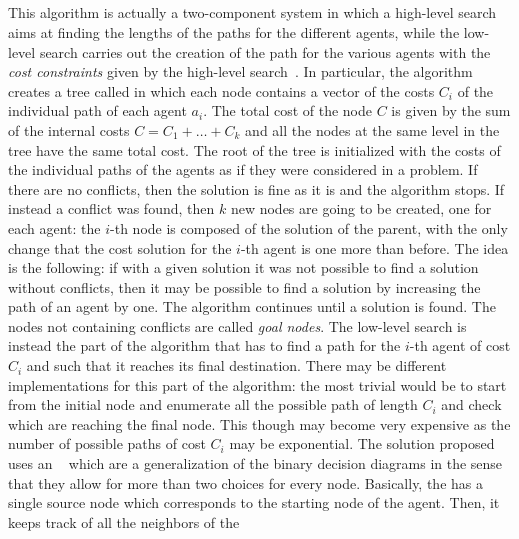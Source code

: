 \subsection{}
This algorithm is actually a two-component system in which a high-level search
aims at finding the lengths of the paths for the different agents, while the 
low-level search carries out the creation of the path for the various
agents with the \textit{cost constraints} given by the high-level 
search~\cite{MAPF_overview,ICTS}. \newline
In particular, the algorithm creates a tree called  in which each 
node contains a vector of the costs $C_i$ of the individual path of each agent
$a_i$. The total cost of the node $C$ is given by the sum of the internal costs
$C=C_1+\hdots+C_k$ and all the nodes at the same level in the tree have the
same total cost. \newline
The root of the tree is initialized with the costs of the individual paths of
the agents as if they were considered in a  problem. If there are no
conflicts, then the solution is fine as it is and the algorithm stops. If 
instead a conflict was found, then $k$ new nodes are going to be created, one 
for each agent: the $i$-th node is composed of the solution of the parent, with
the only change that the cost solution for the $i$-th agent is one more than
before. The idea is the following: if with a given solution it was not possible
to find a solution without conflicts, then it may be possible to find a
solution by increasing the path of an agent by one. The algorithm continues 
until a solution is found. The  nodes not containing conflicts are 
called \textit{goal nodes}. \newline
The low-level search is instead the part of the algorithm that has to find a
path for the $i$-th agent of cost $C_i$ and such that it reaches its final
destination. There may be different implementations for this part of the
algorithm: the most trivial would be to start from the initial node and
enumerate all the possible path of length $C_i$ and check which are reaching
the final node. This though may become very expensive as the number of possible
paths of cost $C_i$ may be exponential. The solution proposed~\cite{ICTS} uses
an ~\cite{MDD} which are a generalization of the binary decision
diagrams in the sense that they allow for more than two choices for every node.
Basically, the  has a single source node which corresponds to the
starting node of the agent. Then, it keeps track of all the neighbors of the
